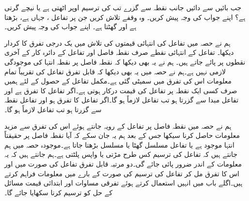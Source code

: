 جب  بائیں سے دائیں جانب نقطہ  سے گزرے تب  کی ترسیم اوپر اٹھتی ہے یا نیچے گرتی ہے؟ اپنے جواب کی وجہ پیش کریں۔
وہ وقفے تلاش کریں جن پر تفاعل ، جہاں  ہے، بڑھتا ہے اور گھٹتا ہے۔ اپنے جواب کی وجہ پیش کریں۔

ہم نے حصہ  میں تفاعل کی انتہائی قیمتوں کی تلاش میں یک درجی تفرق کا کردار دیکھا۔ تفاعل کے انتہائی نقطے صرف نقطہ فاصل اور تفاعل  کے دائرہ کار کے آخری نقطوں  پر پائے جاتے ہیں۔ ہم نے یہ بھی دیکھا کہ نقطہ فاصل پر نقطہ انتہا کی موجودگی لازمی نہیں ہے۔ہم نے حصہ  میں یہ بھی دیکھا کہ قابل تفرق تفاعل کی تقریباً تمام معلومات اس کی تفرق میں سمیٹی گئی ہے۔مکمل تفاعل کے حصول کے لئے  ہمیں صرف کسی ایک نقطہ پر تفاعل کی قیمت درکار ہوتی ہے۔اگر تفاعل کا تفرق  ہے اور تفاعل مبدا سے گزرتا ہو تب تفاعل لازماً  ہو گا۔اگر تفاعل کا تفرق  ہو اور تفاعل نقطہ  سے گزرتا ہو تب تفاعل لازماً   ہو گا۔

ہم نے حصہ  میں نقطہ فاصل پر تفاعل کے رویہ جانتے ہوئے اس کی تفرق سے مزید معلومات حاصل کرنا سیکھا جس کے بعد ہم یہ جان سکے کہ آیا نقطہ فاصل پر حقیقتاً انتہا موجود ہے یا تفاعل مسلسل گھٹا یا مسلسل بڑھتا جاتا ہے۔موجودہ حصہ میں ہم جانتے  ہیں کہ تفاعل  کی ترسیم  کس طرح مڑتی یا واپس پلٹتی ہے۔ہم جانتے ہیں کہ یہ معلومات  کے اندر ضرور  پائی جائے گی۔دو مرتبہ قابل تفرق تفاعل کی صورت میں   اور اس کا تفرق  مل کر تفاعل کی ترسیم کی صورت کے بارے میں معلومات فراہم کرتے ہیں۔اگلے باب میں  انہیں استعمال کرتے ہوئے تفرقی مساوات اور ابتدائی قیمت مسائل کے حل کو ترسیم کرنا سکھایا جائے گا۔

